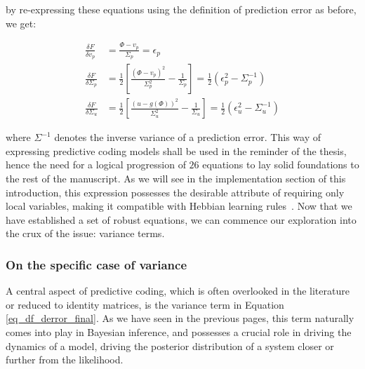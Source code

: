 by re-expressing these equations using the definition of prediction error as before, we get:

\begin{equation}
\label{eq_df_derror_final}
    \begin{aligned}
    \frac{\delta F}{\delta v_p} &= \frac{\Phi - v_p}{{\Sigma_p}} = \epsilon_p \\
    \frac{\delta F}{\delta \Sigma_p} &= \frac{1}{2} \left[ \frac{(\Phi - v_p)^2}{{\Sigma_p^2}} - \frac{1}{{\Sigma_p}} \right]  = \frac{1}{2} \left(\epsilon_p^2 - {\Sigma_p^{-1}} \right) \\
    \frac{\delta F}{\delta \Sigma_u} &=  \frac{1}{2} \left[ \frac{(u - g(\Phi))^2}{{\Sigma_u^2}} - \frac{1}{{\Sigma_u}} \right] = \frac{1}{2} \left(\epsilon_u^2 - {\Sigma_u^{-1}} \right)
    \end{aligned}
\end{equation}

where ${\Sigma^{-1}}$ denotes the inverse variance of a prediction error. This way of expressing predictive coding models shall be used in the reminder of the thesis, hence the need for a logical progression of $26$ equations to lay solid foundations to the rest of the manuscript. As we will see in the implementation section of this introduction, this expression possesses the desirable attribute of requiring only local variables, making it compatible with Hebbian learning rules~\cite{hebb1949organization}. Now that we have established a set of robust equations, we can commence our exploration into the crux of the issue: variance terms.

\subsubsection{On the specific case of variance}
A central aspect of predictive coding, which is often overlooked in the literature~\cite{rao1999predictive, Zongker2006, spratling2017hierarchical, wen2018deep, millidge2020relaxing} or reduced to identity matrices, is the variance term in Equation \ref{eq_df_derror_final}. As we have seen in the previous pages, this term naturally comes into play in Bayesian inference, and possesses a crucial role in driving the dynamics of a model, driving the posterior distribution of a system closer or further from the likelihood.

